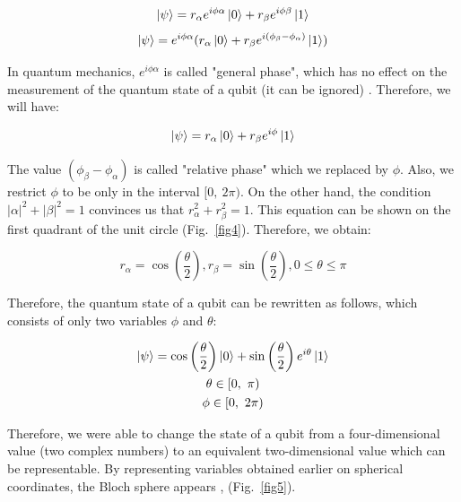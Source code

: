 \documentclass[conference]{IEEEtran}
\begin{document}
\begin{equation}
	\ket{\psi} = r_\alpha e^{i\phi\alpha}\ket{0} + r_\beta e^{i\phi\beta}\ket{1}
	\label{eq2}
\end{equation}
\begin{equation}
	\ket{\psi} = e^{i\phi\alpha}(r_\alpha \ket{0} + r_\beta e^{i(\phi_\beta - \phi_\alpha)}\ket{1})
	\label{eq3}
\end{equation}

In quantum mechanics, $e^{i\phi\alpha}$ is called "general phase", which has no effect on the measurement of the quantum state of a qubit (it can be ignored) \cite{b20}. Therefore, we will have:

\begin{equation}
	\ket{\psi} = r_\alpha \ket{0} + r_\beta e^{i\phi}\ket{1}
	\label{eq4}
\end{equation}

The value $(\phi_\beta - \phi_\alpha)$ is called "relative phase" which we replaced by $\phi$. Also, we restrict $\phi$ to be only in the interval $[0, \ 2\pi)$. On the other hand, the condition $|\alpha|^{2} + |\beta|^{2} = 1$ convinces us that $r_\alpha ^{2} + r_\beta ^{2} = 1$. This equation can be shown on the first quadrant of the unit circle (Fig.~\ref{fig4}). Therefore, we obtain:

\begin{equation}
	r_\alpha = \cos\left(\frac{\theta}{2}\right), r_\beta = \sin\left(\frac{\theta}{2}\right), 0 \le \theta \le \pi
	\label{eq5}
\end{equation}

Therefore, the quantum state of a qubit can be rewritten as follows, which consists of only two variables $\phi$ and $\theta$:

\begin{gather}
	\ket{\psi} = \cos\left(\frac{\theta}{2}\right)\ket{0} + \sin\left(\frac{\theta}{2}\right)e^{i\theta}\ket{1}
	\\
	\theta \in \left[0, \ \pi\right)
	\\
	\phi \in \left[0, \ 2\pi\right)
	\label{eq6}
\end{gather}

Therefore, we were able to change the state of a qubit from a four-dimensional value (two complex numbers) to an equivalent two-dimensional value which can be representable. By representing variables obtained earlier on spherical coordinates, the Bloch sphere appears \cite{b20}, \cite{b21} (Fig.~\ref{fig5}).
\end{document}
